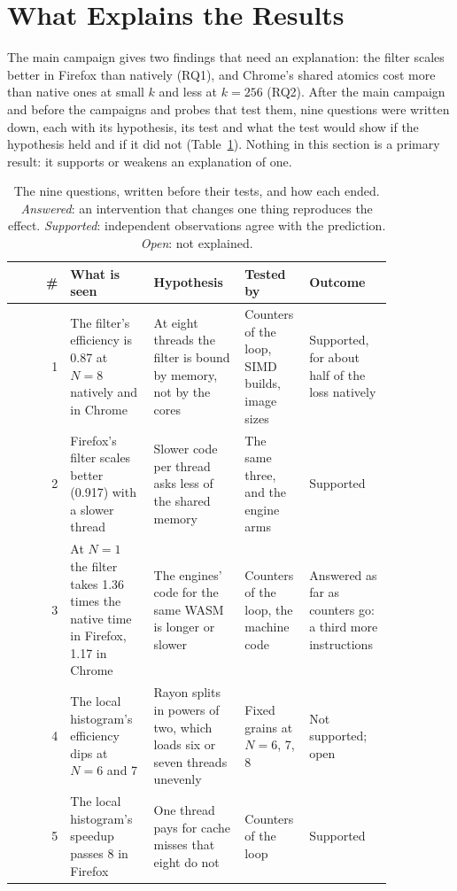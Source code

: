 \section{What Explains the Results}
\label{sec:why}

The main campaign gives two findings that need an explanation: the filter
scales better in Firefox than natively (RQ1), and Chrome's shared atomics
cost more than native ones at small $k$ and less at $k=256$ (RQ2). After
the main campaign and before the campaigns and probes that test them, nine
questions were written down, each with its hypothesis, its test and what
the test would show if the hypothesis held and if it did not
(Table~\ref{tab:questions}). Nothing in this section is a primary result:
it supports or weakens an explanation of one.

\begin{table}[htbp]
\caption{The nine questions, written before their tests, and how each
ended. \emph{Answered}: an intervention that changes one thing reproduces
the effect. \emph{Supported}: independent observations agree with the
prediction. \emph{Open}: not explained.}
\label{tab:questions}
\centering\scriptsize
\begin{tabular}{rp{0.22\linewidth}p{0.24\linewidth}p{0.17\linewidth}p{0.22\linewidth}}
\toprule
\# & What is seen & Hypothesis & Tested by & Outcome \\
\midrule
1 & The filter's efficiency is 0.87 at $N=8$ natively and in Chrome & At eight threads the filter is bound by memory, not by the cores & Counters of the loop, SIMD builds, image sizes & Supported, for about half of the loss natively \\
2 & Firefox's filter scales better (0.917) with a slower thread & Slower code per thread asks less of the shared memory & The same three, and the engine arms & Supported \\
3 & At $N=1$ the filter takes 1.36 times the native time in Firefox, 1.17 in Chrome & The engines' code for the same WASM is longer or slower & Counters of the loop, the machine code & Answered as far as counters go: a third more instructions \\
4 & The local histogram's efficiency dips at $N=6$ and 7 & Rayon splits in powers of two, which loads six or seven threads unevenly & Fixed grains at $N=6$, 7, 8 & Not supported; open \\
5 & The local histogram's speedup passes 8 in Firefox & One thread pays for cache misses that eight do not & Counters of the loop & Supported \\

\end{tabular}
\end{table}
